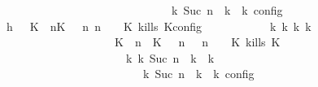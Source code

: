 \begin{isabellebody}
\ \ \ \ \ \ \ \ \ \ \ \ \ \ \ \ \ \ \ \ \ \ \ \ \ \ {\isasymand}\ {\isasymrho}\ {\isasymin}\ {\isasymlbrakk}\ {\isasymGamma}\isactrlsub k{\isacharcomma}\ Suc\ n\ {\isasymturnstile}\ {\isasymPsi}\isactrlsub k\ {\isasymtriangleright}\ {\isasymPhi}\isactrlsub k\ {\isasymrbrakk}\isactrlsub c\isactrlsub o\isactrlsub n\isactrlsub f\isactrlsub i\isactrlsub g{\isacartoucheclose}\isanewline
\ \ \ \ \ \ \isamarkupfalse%
\ {\isacharminus}\isanewline
\ \ \ \ \ \ \ \ \isamarkupfalse%
\ h{}{\isacharcolon}\ {\isacartoucheopen}{\isasymrho}\ {\isasymin}\ {\isasymlbrakk}{\isacharparenleft}{\isacharparenleft}K\ {\isasymUp}\ n{\isacharparenright}{\isacharhash}{\isacharparenleft}K\ {\isasymnot}{\isasymUp}\ {\isasymge}\ n{\isacharparenright}{\isacharhash}{\isasymGamma}{\isacharparenright}{\isacharcomma}\ n\ {\isasymturnstile}\ {\isasymPsi}\ {\isasymtriangleright}\ {\isacharparenleft}{\isacharparenleft}K\ kills\ K\isactrlsub c\isactrlsub o\isactrlsub n\isactrlsub f\isactrlsub i\isactrlsub g{\isacartoucheclose}\isanewline
\ \ \ \ \ \ \ \ \isamarkupfalse%
\ \isamarkupfalse%
\ {\isacartoucheopen}{\isasymexists}{\isasymGamma}\isactrlsub k\ {\isasymPsi}\isactrlsub k\ {\isasymPhi}\isactrlsub k\ k{\isachardot}\ {\isacharparenleft}\isanewline
\ \ \ \ \ \ \ \ \ \ \ \ \ \ \ \ \ \ \ \ {\isacharparenleft}{\isacharparenleft}{\isacharparenleft}K\ {\isasymUp}\ n{\isacharparenright}\ {\isacharhash}\ {\isacharparenleft}K\ {\isasymnot}{\isasymUp}\ {\isasymge}\ n{\isacharparenright}\ {\isacharhash}\ {\isasymGamma}{\isacharparenright}{\isacharcomma}\ n\ {\isasymturnstile}\ {\isasymPsi}\ {\isasymtriangleright}\ {\isacharparenleft}{\isacharparenleft}K\ kills\ K\ {\isacharhash}\ {\isasymPhi}{\isacharparenright}{\isacharparenright}\isanewline
\ \ \ \ \ \ \ \ \ \ \ \ \ \ \ \ \ \ \ \ \ \ {\isasymhookrightarrow}\isactrlbsup k\isactrlesup \ {\isacharparenleft}{\isasymGamma}\isactrlsub k{\isacharcomma}\ Suc\ n\ {\isasymturnstile}\ {\isasymPsi}\isactrlsub k\ {\isasymtriangleright}\ {\isasymPhi}\isactrlsub k{\isacharparenright}\isanewline
\ \ \ \ \ \ \ \ \ \ \ \ \ \ \ \ \ \ \ \ {\isacharparenright}\ {\isasymand}\ {\isasymrho}\ {\isasymin}\ {\isasymlbrakk}\ {\isasymGamma}\isactrlsub k{\isacharcomma}\ Suc\ n\ {\isasymturnstile}\ {\isasymPsi}\isactrlsub k\ {\isasymtriangleright}\ {\isasymPhi}\isactrlsub k\ {\isasymrbrakk}\isactrlsub c\isactrlsub o\isactrlsub n\isactrlsub f\isactrlsub i\isactrlsub g{\isacartoucheclose}\isanewline

\end{isabellebody}
